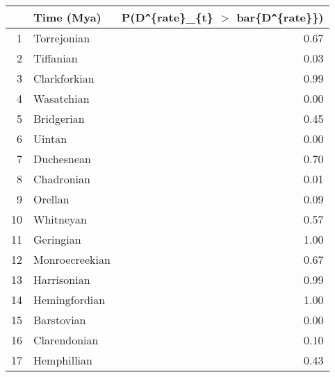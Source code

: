 \begin{table}[ht]
\centering
\begin{tabular}{rlr}
  \hline
 & Time (Mya) & P(D\verb|^|\{rate\}\_\{t\} $>$ bar\{D\verb|^|\{rate\}\}) \\ 
  \hline
1 & Torrejonian & 0.67 \\ 
  2 & Tiffanian & 0.03 \\ 
  3 & Clarkforkian & 0.99 \\ 
  4 & Wasatchian & 0.00 \\ 
  5 & Bridgerian & 0.45 \\ 
  6 & Uintan & 0.00 \\ 
  7 & Duchesnean & 0.70 \\ 
  8 & Chadronian & 0.01 \\ 
  9 & Orellan & 0.09 \\ 
  10 & Whitneyan & 0.57 \\ 
  11 & Geringian & 1.00 \\ 
  12 & Monroecreekian & 0.67 \\ 
  13 & Harrisonian & 0.99 \\ 
  14 & Hemingfordian & 1.00 \\ 
  15 & Barstovian & 0.00 \\ 
  16 & Clarendonian & 0.10 \\ 
  17 & Hemphillian & 0.43 \\ 
   \hline
\end{tabular}
\label{tab:rate_peak}
\end{table}
